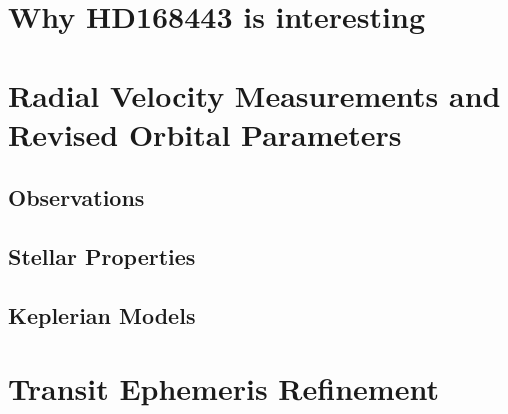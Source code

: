 \documentclass[12pt,preprint]{emulateapj}
\begin{document}
\section{Why HD168443 is interesting}
\label{motivation}


\section{Radial Velocity Measurements and Revised Orbital Parameters}
\label{revisedop}


\subsection{Observations}


\subsection{Stellar Properties}
\label{steprop}




\subsection{Keplerian Models}






\section{Transit Ephemeris Refinement}
\label{ephemeris}


\end{document}
